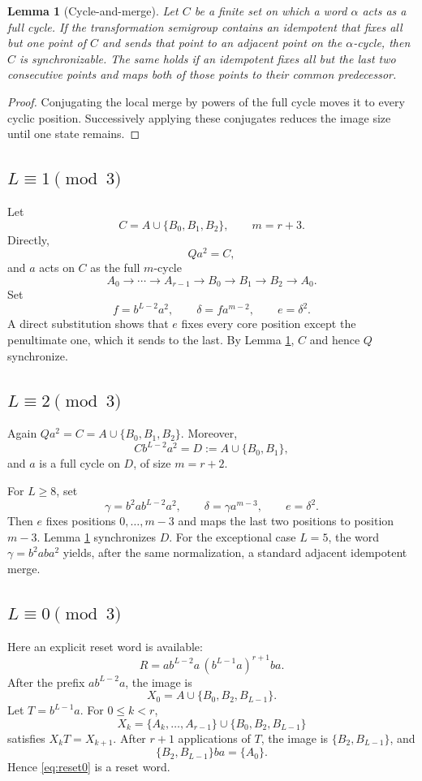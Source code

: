 \documentclass[11pt]{article}
\newtheorem{lemma}{Lemma}
\theoremstyle{definition}
\theoremstyle{remark}
\begin{document}
\begin{lemma}[Cycle-and-merge]\label{lem:cyclemerge}
Let $C$ be a finite set on which a word $\alpha$ acts as a full cycle. If the transformation semigroup contains an idempotent that fixes all but one point of $C$ and sends that point to an adjacent point on the $\alpha$-cycle, then $C$ is synchronizable. The same holds if an idempotent fixes all but the last two consecutive points and maps both of those points to their common predecessor.
\end{lemma}
\begin{proof}
Conjugating the local merge by powers of the full cycle moves it to every cyclic position. Successively applying these conjugates reduces the image size until one state remains.
\end{proof}

\subsection{$L\equiv1\pmod3$}
Let
\[
C=A\cup\{B_0,B_1,B_2\},\qquad m=r+3.
\]
Directly,
\[
Qa^2=C,
\]
and $a$ acts on $C$ as the full $m$-cycle
\[
A_0\to\cdots\to A_{r-1}\to B_0\to B_1\to B_2\to A_0.
\]
Set
\[
f=b^{L-2}a^2,\qquad \delta=f a^{m-2},\qquad e=\delta^2.
\]
A direct substitution shows that $e$ fixes every core position except the penultimate one, which it sends to the last. By Lemma \ref{lem:cyclemerge}, $C$ and hence $Q$ synchronize.

\subsection{$L\equiv2\pmod3$}
Again $Qa^2=C=A\cup\{B_0,B_1,B_2\}$. Moreover,
\[
C b^{L-2}a^2=D:=A\cup\{B_0,B_1\},
\]
and $a$ is a full cycle on $D$, of size $m=r+2$.

For $L\ge8$, set
\[
\gamma=b^2ab^{L-2}a^2,\qquad \delta=\gamma a^{m-3},\qquad e=\delta^2.
\]
Then $e$ fixes positions $0,\ldots,m-3$ and maps the last two positions to position $m-3$. Lemma \ref{lem:cyclemerge} synchronizes $D$. For the exceptional case $L=5$, the word $\gamma=b^2aba^2$ yields, after the same normalization, a standard adjacent idempotent merge.

\subsection{$L\equiv0\pmod3$}
Here an explicit reset word is available:
\begin{equation}\label{eq:reset0}
R=ab^{L-2}a\,(b^{L-1}a)^{r+1}ba.
\end{equation}
After the prefix $ab^{L-2}a$, the image is
\[
X_0=A\cup\{B_0,B_2,B_{L-1}\}.
\]
Let $T=b^{L-1}a$. For $0\le k<r$,
\[
X_k=\{A_k,\ldots,A_{r-1}\}\cup\{B_0,B_2,B_{L-1}\}
\]
satisfies $X_kT=X_{k+1}$. After $r+1$ applications of $T$, the image is $\{B_2,B_{L-1}\}$, and
\[
\{B_2,B_{L-1}\}ba=\{A_0\}.
\]
Hence \eqref{eq:reset0} is a reset word.
\end{document}
